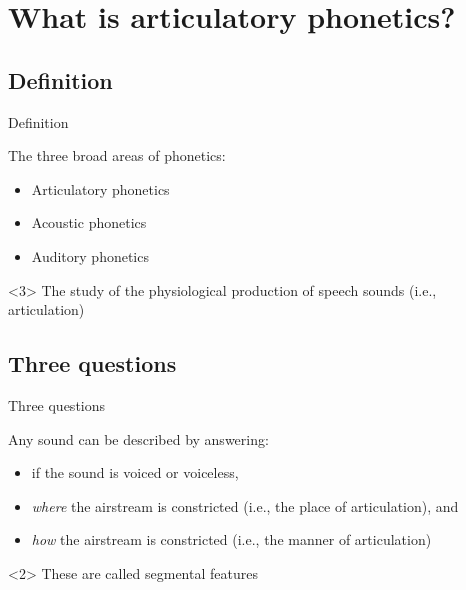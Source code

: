 \documentclass{beamer}
\subtitle[Consonant Articulation]{Articulation of English Consonants}
\newcommand{\suboneone}{Definition}
\newcommand{\subonetwo}{Three questions}
\begin{document}
  

  \section{What is articulatory phonetics?}
    \subsection{\suboneone}
      \begin{frame}{\suboneone}
        \begin{block}{}
          The three broad areas of phonetics:
          \begin{itemize}
            \item \alert<2->{Articulatory phonetics}
            \item Acoustic phonetics
            \item Auditory phonetics
          \end{itemize}
        \end{block}
        \begin{definition}<3>
          The study of the physiological production of speech sounds (i.e., \alert{articulation})
        \end{definition}
      \end{frame}

    \subsection{\subonetwo}
      \begin{frame}{\subonetwo}
        \begin{block}{}
          Any sound can be described by answering:
          \begin{itemize}
            \item if the sound is \alert{voiced} or \alert{voiceless},
            \item \emph{where} the airstream is constricted (i.e., the \alert{place of articulation}), and
            \item \emph{how} the airstream is constricted (i.e., the \alert{manner of articulation})
          \end{itemize}
        \end{block}
        \begin{alertblock}<2>{}
          These are called \alert{segmental features}
        \end{alertblock}
      \end{frame}
\end{document}
